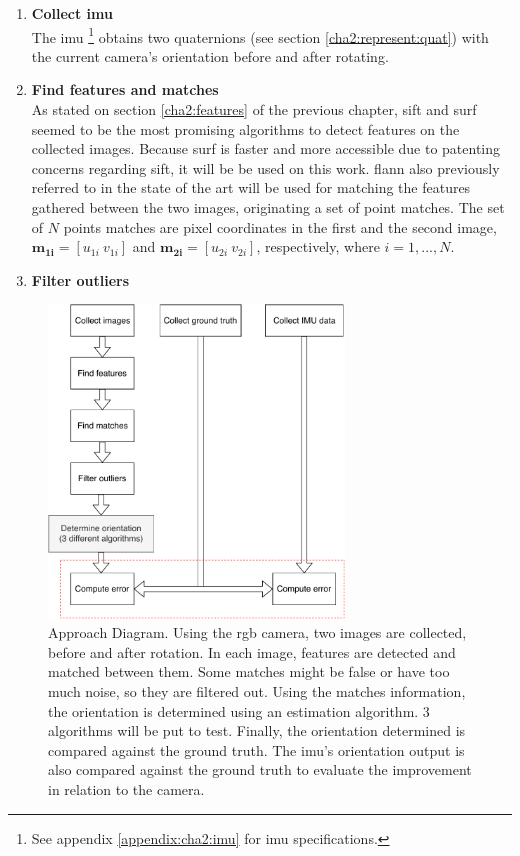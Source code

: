 \begin{enumerate}
	 \item \textbf{Collect \acrshort{imu}}\\
	 The \acrlong{imu} \footnote{See appendix \ref{appendix:cha2:imu} for \acrshort{imu} specifications.} obtains two quaternions (see section \ref{cha2:represent:quat}) with the current camera's orientation before and after rotating.
	 
	\item \textbf{Find features and matches}\\
	As stated on section \ref{cha2:features} of the previous chapter,
	\acrshort{sift} and \acrshort{surf} seemed to be the most promising algorithms to detect features on the collected images. Because \acrshort{surf} is faster and more accessible due to patenting concerns regarding \acrshort{sift}, it will be be used on this work.
	\acrshort{flann} also previously referred to in the state of the art will be used for matching the features gathered between the two images, originating a set of point matches. The set of $N$ points matches are pixel coordinates in the first and the second image, $\mathbf{m_{1i}} = [u_{1i} \ v_{1i}]$ and $\mathbf{m_{2i}} = [u_{2i} \ v_{2i}]$, respectively, where $i=1,...,N$.
	
	\item \textbf{Filter outliers}\\
	
	
\end{enumerate}


\begin{figure}[ht]
	\centering
	\includegraphics[width=0.7\textwidth]{images/approach.pdf}
	\caption[Approach Diagram]{Approach Diagram. Using the \acrshort{rgb} camera, two images are collected, before and after rotation. In each image, features are detected and matched between them. Some matches might be false or have too much noise, so they are filtered out. Using the matches information, the orientation is determined using an estimation algorithm. 3 algorithms will be put to test. Finally, the orientation determined is compared against the ground truth. The \acrshort{imu}'s orientation output is also compared against the ground truth to evaluate the improvement in relation to the camera.}
	\label{cha3:methodology:approach}
\end{figure}


